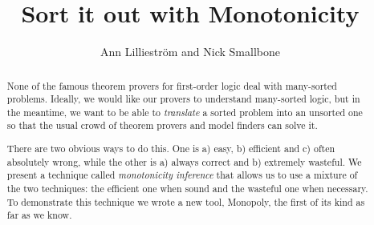 \documentclass{llncs}
\title{Sort it out with Monotonicity}
\author{Ann Lilliestr\"om and Nick Smallbone}
\institute{ Chalmers University of Technology, Gothenburg, Sweden
         \\ \email{\{annl,nicsma\}@chalmers.se}
          }
\begin{document}
\maketitle

\begin{abstract}
None of the famous theorem provers for first-order logic deal with
many-sorted problems. Ideally, we would like our provers to understand
many-sorted logic, but in the meantime, we want to be able to
\emph{translate} a sorted problem into an unsorted one so that the
usual crowd of theorem provers and model finders can solve it.

There are two obvious ways to do this. One is a) easy, b) efficient
and c) often absolutely wrong, while the other is a) always correct
and b) extremely wasteful. We present a technique called
\emph{monotonicity inference} that allows us to use a mixture of the
two techniques: the efficient one when sound and the wasteful one when
necessary. To demonstrate this technique we wrote a new tool,
Monopoly, the first of its kind as far as we know.
\end{abstract}







 
\end{document}

